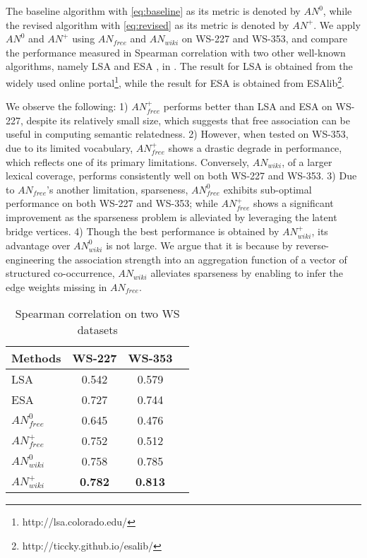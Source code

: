 The baseline algorithm with \eqref{eq:baseline} as its metric 
is denoted by $AN^0$, while the revised algorithm with \eqref{eq:revised} as its metric is denoted by $AN^+$.
We apply $AN^0$ and $AN^+$
using $AN_{free}$ and $AN_{wiki}$ on WS-227 and WS-353, and compare the performance measured in Spearman
correlation with two other well-known algorithms, namely
LSA \cite{LSA} and ESA \cite{ESA}, in . The result
for LSA is obtained from the widely used online
portal\footnote{http://lsa.colorado.edu/}, while the result for ESA is obtained from
ESAlib\footnote{http://ticcky.github.io/esalib/}.

We observe the following:
1) $AN_{free}^+$ performs better than LSA and ESA on WS-227,
despite its relatively small size, which suggests that free
association can be useful in computing semantic relatedness.
2) However, when tested on WS-353, due to its limited vocabulary,
$AN_{free}^+$ shows a drastic degrade in performance, which reflects
one of its primary limitations. Conversely, $AN_{wiki}$, of a larger lexical
coverage, performs consistently well on both WS-227 and WS-353.
3) Due to $AN_{free}$'s another limitation, sparseness, $AN_{free}^0$ 
exhibits sub-optimal performance on both WS-227 and WS-353; while 
$AN_{free}^+$ shows a significant improvement as the sparseness 
problem is alleviated by leveraging the latent bridge vertices. 
4) Though the best performance is obtained by $AN_{wiki}^+$, its advantage
over $AN_{wiki}^0$ is not large. We argue that it is because by 
reverse-engineering the association strength into an aggregation 
function of a vector of structured co-occurrence,
$AN_{wiki}$ alleviates sparseness by enabling to infer the edge weights missing 
in $AN_{free}$. 

\begin{table}[ht]
\centering
\caption{Spearman correlation on two WS datasets}
\begin{tabular}{lccc}
\hline
Methods & WS-227 & WS-353 \\
\hline
LSA & 0.542 & 0.579 \\
ESA & 0.727 & 0.744 \\
$AN_{free}^0$ & 0.645 & 0.476 \\
$AN_{free}^+$ & 0.752 & 0.512 \\
$AN_{wiki}^0$ & 0.758 & 0.785 \\
$AN_{wiki}^+$ & {\bf0.782} & {\bf0.813} \\
\hline
\end{tabular}
\label{tab:ws227}
\end{table}

